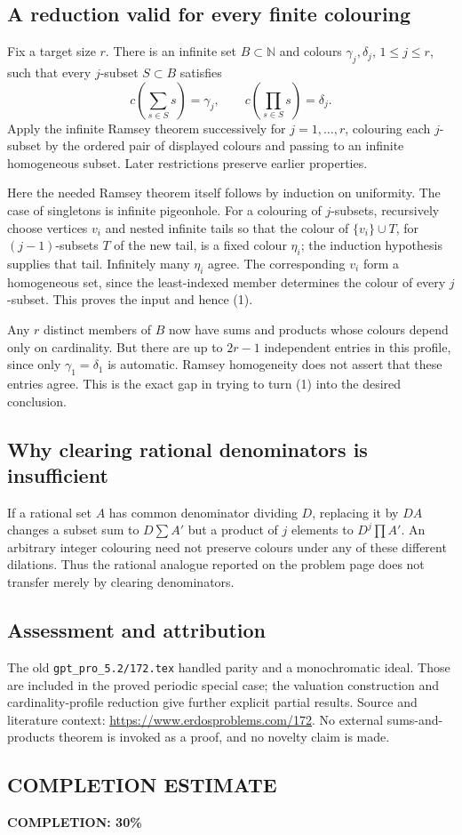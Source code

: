 \subsection*{A reduction valid for every finite colouring}
Fix a target size $r$. There is an infinite set $B\subset\mathbb N$ and colours
$\gamma_j,\delta_j$, $1\le j\le r$, such that every $j$-subset $S\subset B$ satisfies
\[
 c\left(\sum_{s\in S}s\right)=\gamma_j,\qquad
 c\left(\prod_{s\in S}s\right)=\delta_j.
 \tag{1}
\]
Apply the infinite Ramsey theorem successively for $j=1,\ldots,r$, colouring each $j$-subset by the ordered pair of displayed colours and passing to an infinite homogeneous subset. Later restrictions preserve earlier properties.

Here the needed Ramsey theorem itself follows by induction on uniformity. The case of singletons is infinite pigeonhole. For a colouring of $j$-subsets, recursively choose vertices $v_i$ and nested infinite tails so that the colour of $\{v_i\}\cup T$, for $(j-1)$-subsets $T$ of the new tail, is a fixed colour $\eta_i$; the induction hypothesis supplies that tail. Infinitely many $\eta_i$ agree. The corresponding $v_i$ form a homogeneous set, since the least-indexed member determines the colour of every $j$-subset. This proves the input and hence (1).

Any $r$ distinct members of $B$ now have sums and products whose colours depend only on cardinality. But there are up to $2r-1$ independent entries in this profile, since only $\gamma_1=\delta_1$ is automatic. Ramsey homogeneity does not assert that these entries agree. This is the exact gap in trying to turn (1) into the desired conclusion.

\subsection*{Why clearing rational denominators is insufficient}
If a rational set $A$ has common denominator dividing $D$, replacing it by $DA$ changes a subset sum to $D\sum A'$ but a product of $j$ elements to $D^j\prod A'$. An arbitrary integer colouring need not preserve colours under any of these different dilations. Thus the rational analogue reported on the problem page does not transfer merely by clearing denominators.

\subsection*{Assessment and attribution}
The old \texttt{gpt\_pro\_5.2/172.tex} handled parity and a monochromatic ideal. Those are included in the proved periodic special case; the valuation construction and cardinality-profile reduction give further explicit partial results. Source and literature context: \url{https://www.erdosproblems.com/172}. No external sums-and-products theorem is invoked as a proof, and no novelty claim is made.
\subsection*{COMPLETION ESTIMATE}
\textbf{COMPLETION: 30\%}
